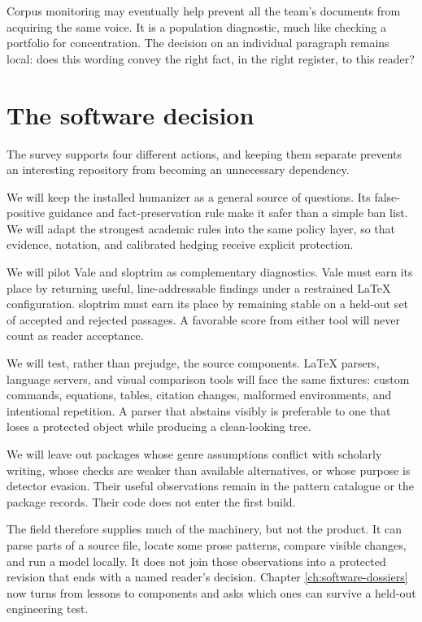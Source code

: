 Corpus monitoring may eventually help prevent all the team's documents from
acquiring the same voice. It is a population diagnostic, much like checking a
portfolio for concentration. The decision on an individual paragraph remains
local: does this wording convey the right fact, in the right register, to this
reader?

\section{The software decision}
\label{sec:oss-decision}

The survey supports four different actions, and keeping them separate prevents
an interesting repository from becoming an unnecessary dependency.

We will keep the installed humanizer as a general source of questions. Its
false-positive guidance and fact-preservation rule make it safer than a simple
ban list. We will adapt the strongest academic rules into the same policy
layer, so that evidence, notation, and calibrated hedging receive explicit
protection.

We will pilot Vale and sloptrim as complementary diagnostics. Vale must earn
its place by returning useful, line-addressable findings under a restrained
LaTeX configuration. sloptrim must earn its place by remaining stable on a
held-out set of accepted and rejected passages. A favorable score from either
tool will never count as reader acceptance.

We will test, rather than prejudge, the source components. LaTeX parsers,
language servers, and visual comparison tools will face the same fixtures:
custom commands, equations, tables, citation changes, malformed environments,
and intentional repetition. A parser that abstains visibly is preferable to
one that loses a protected object while producing a clean-looking tree.

We will leave out packages whose genre assumptions conflict with scholarly
writing, whose checks are weaker than available alternatives, or whose purpose
is detector evasion. Their useful observations remain in the pattern catalogue
or the package records. Their code does not enter the first build.

The field therefore supplies much of the machinery, but not the product. It
can parse parts of a source file, locate some prose patterns, compare visible
changes, and run a model locally. It does not join those observations into a
protected revision that ends with a named reader's decision. Chapter
\ref{ch:software-dossiers} now turns from lessons to components and asks which
ones can survive a held-out engineering test.
